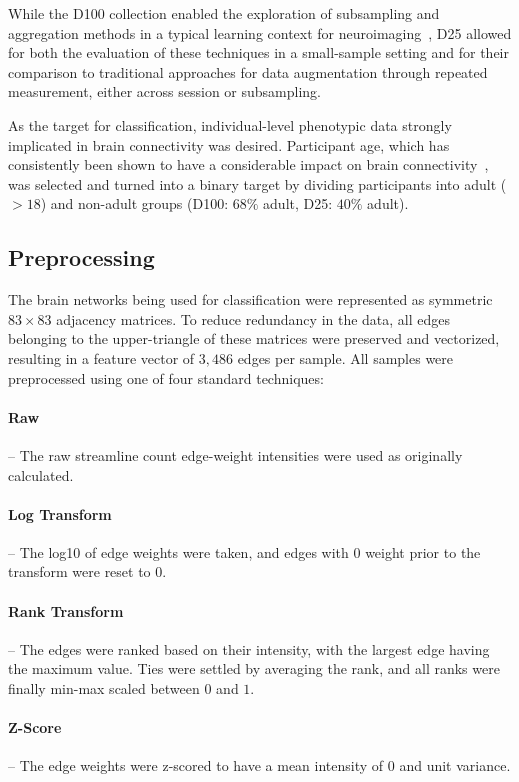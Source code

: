 \documentclass[fleqn,10pt]{SelfArx} %
\begin{document}
While the D100 collection enabled the exploration of subsampling and aggregation methods in a typical learning context
for neuroimaging~\cite{Dimitriadis2017-pd,Buchanan2014-pm}, D25 allowed for both the evaluation of these techniques in
a small-sample setting and for their comparison to traditional approaches for data augmentation through repeated
measurement, either across session or subsampling.

As the target for classification, individual-level phenotypic data strongly implicated in brain connectivity was
desired. Participant age, which has consistently been shown to have a considerable impact on brain
connectivity~\cite{Meier2012-ve,Wu2012-uc,Bookheimer2019-ti,Zhao2015-rm}, was selected and turned into a binary target
by dividing participants into adult ($>18$) and non-adult groups (D100: $68\%$ adult, D25: $40\%$ adult).

\subsection*{Preprocessing}
The brain networks being used for classification were represented as symmetric $83 \times 83$ adjacency matrices. To
reduce redundancy in the data, all edges belonging to the upper-triangle of these matrices were preserved and
vectorized, resulting in a feature vector of $3,486$ edges per sample. All samples were preprocessed using one of four
standard techniques:

\paragraph{Raw} – The raw streamline count edge-weight intensities were used as originally calculated.

\paragraph{Log Transform} – The log10 of edge weights were taken, and edges with $0$ weight prior to the transform were
reset to $0$.

\paragraph{Rank Transform} – The edges were ranked based on their intensity, with the largest edge having the maximum
value. Ties were settled by averaging the rank, and all ranks were finally min-max scaled between $0$ and $1$.

\paragraph{Z-Score} – The edge weights were z-scored to have a mean intensity of $0$ and unit variance.
\end{document}
